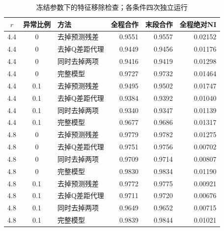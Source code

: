 \begin{table}[!htbp]
\centering\small
\caption{冻结参数下的特征移除检查；各条件四次独立运行}
\label{tab:w2-features}
\begin{tabular}{cclrrr}
\toprule
$r$ & 异常比例 & 方法 & 全程合作 & 末段合作 & 全程绝对NI \\
\midrule
4.4 & 0 & 去掉预测残差 & 0.9551 & 0.9557 & 0.02152 \\
4.4 & 0 & 去掉Q差距代理 & 0.9449 & 0.9456 & 0.01176 \\
4.4 & 0 & 同时去掉两项 & 0.9416 & 0.9419 & 0.01298 \\
4.4 & 0 & 完整模型 & 0.9727 & 0.9732 & 0.01464 \\
4.4 & 0.1 & 去掉预测残差 & 0.9495 & 0.9502 & 0.01747 \\
4.4 & 0.1 & 去掉Q差距代理 & 0.9384 & 0.9392 & 0.01040 \\
4.4 & 0.1 & 同时去掉两项 & 0.9340 & 0.9347 & 0.01139 \\
4.4 & 0.1 & 完整模型 & 0.9677 & 0.9686 & 0.01317 \\
4.8 & 0 & 去掉预测残差 & 0.9779 & 0.9782 & 0.01275 \\
4.8 & 0 & 去掉Q差距代理 & 0.9751 & 0.9756 & 0.00702 \\
4.8 & 0 & 同时去掉两项 & 0.9709 & 0.9714 & 0.00807 \\
4.8 & 0 & 完整模型 & 0.9830 & 0.9834 & 0.01190 \\
4.8 & 0.1 & 去掉预测残差 & 0.9772 & 0.9775 & 0.00921 \\
4.8 & 0.1 & 去掉Q差距代理 & 0.9711 & 0.9720 & 0.00676 \\
4.8 & 0.1 & 同时去掉两项 & 0.9649 & 0.9652 & 0.00715 \\
4.8 & 0.1 & 完整模型 & 0.9839 & 0.9844 & 0.01021 \\
\bottomrule
\end{tabular}
\par{}
\end{table}
